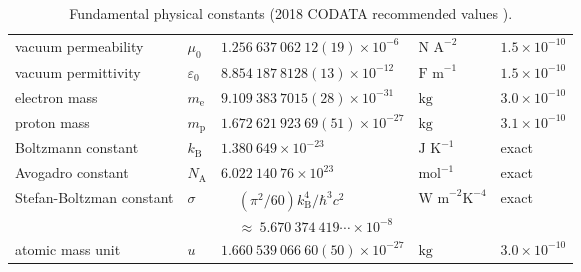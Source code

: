 \begin{table}[h!]
\begin{tabular}{ll>{\scriptsize}ll>{\scriptsize}l}
vacuum permeability          & $\mu_0$                    & $1.256\ 637\ 062\ 12(19) \times10^{-6}$                                                                                                & $\text{N A}^{-2}$               & $1.5\times10^{-10}$                                                                       \\
vacuum permittivity          & $\varepsilon_0$            & $8.854\ 187\ 8128(13) \times 10^{-12}$                                                                                                 & $\text{F m}^{-1}$               & $1.5\times10^{-10}$                                                                       \\
electron mass                & $m_\text{e}$               & $9.109\ 383\ 7015(28) \times 10^{-31}$                                                                                                 & $\text{kg}$                     & $3.0\times10^{-10}$                                                                       \\
proton mass                  & $m_\text{p}$               & $1.672\ 621\ 923\ 69(51) \times 10^{-27}$                                                                                              & $\text{kg}$                     & $3.1\times10^{-10}$                                                                       \\
Boltzmann constant           & $k_\text{B}$               & $1.380\ 649 \times 10^{-23}$                                                                                                           & $\text{J K}^{-1}$               & exact                                                                                     \\
Avogadro constant            & $N_\text{A}$               & $6.022\ 140\ 76 \times 10^{23}$                                                                                                        & $\text{mol}^{-1}$               & exact                                                                                     \\
Stefan-Boltzman constant     & $\sigma$                   & $ \begin{aligned} &\left(\pi^2 / 60 \right) k_\text{B}^4/\hbar^3 c^2 \\ &\approx\ 5.670\ 374\ 419 \cdots \times 10^{-8} \end{aligned}$ & $\text{W m}^{-2} \text{K}^{-4}$ & exact                                                                                     \\
atomic mass unit             & $u$                        & $1.660\ 539\ 066\ 60(50) \times 10^{-27}$                                                                                              & $\text{kg}$                     & $3.0\times 10^{-10}$                                                                     \\
\hline \hline
\end{tabular}
\caption{Fundamental physical constants (2018 CODATA recommended values \cite{tiesinga2021codata}).}
\label{table:physConst}
\end{table}
\endgroup

